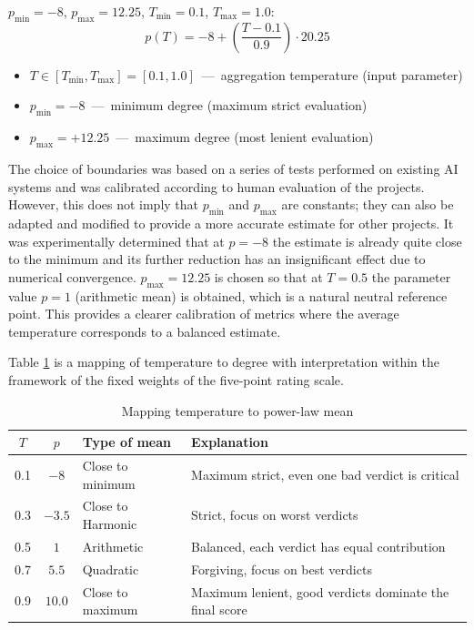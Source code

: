 \documentclass[sn-basic]{sn-jnl}
\theoremstyle{thmstyleone}%
\theoremstyle{thmstyletwo}%
\theoremstyle{thmstylethree}%
\begin{document}
$p_{\min}=-8$, $p_{\max}=12.25$, $T_{\min}=0.1$, $T_{\max}=1.0$:
\[
p(T) = -8 + \left( \frac{T - 0.1}{0.9} \right) \cdot 20.25
\]
\begin{itemize}
\item $T \in [T_{\min}, T_{\max}] = [0.1, 1.0]$~---~aggregation temperature (input parameter)
\item $p_{\min} = -8$~---~minimum degree (maximum strict evaluation)
\item $p_{\max} = +12.25$~---~maximum degree (most lenient evaluation)
\end{itemize}

The choice of boundaries was based on a series of tests performed on existing AI systems and was calibrated according to human evaluation of the projects. However, this does not imply that $p_{\min}$ and $p_{\max}$ are constants; they can also be adapted and modified to provide a more accurate estimate for other projects. It was experimentally determined that at $p = -8$ the estimate is already quite close to the minimum and its further reduction has an insignificant effect due to numerical convergence. $p_{\max} = 12.25$ is chosen so that at $T = 0.5$ the parameter value $p = 1$ (arithmetic mean) is obtained, which is a natural neutral reference point. This provides a clearer calibration of metrics where the average temperature corresponds to a balanced estimate.

Table \ref{tab:temperature-mapping} is a mapping of temperature to degree with interpretation within the framework of the fixed weights of the five-point rating scale.

\begin{table}[h]
\caption{Mapping temperature to power-law mean}
\label{tab:temperature-mapping}
\centering
\begin{tabular}{@{}cclp{6cm}@{}}
\toprule
\textbf{$T$} & \textbf{$p$} & \textbf{Type of mean} & \textbf{Explanation} \\
\midrule
0.1 & $-8$ & Close to minimum & Maximum strict, even one bad verdict is critical \\
0.3 & $-3.5$ & Close to Harmonic & Strict, focus on worst verdicts\\
0.5 & $1$ & Arithmetic & Balanced, each verdict has equal contribution\\
0.7 & $5.5$ & Quadratic & Forgiving, focus on best verdicts\\
0.9 & $10.0$ & Close to maximum & Maximum lenient, good verdicts dominate the final score\\
\bottomrule
\end{tabular}
\end{table}
\end{document}
